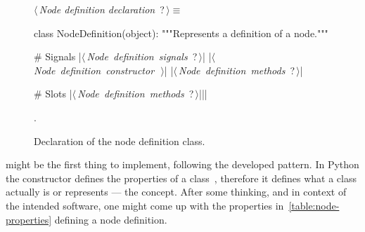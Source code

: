 \documentclass[%
    a4paper,    %
    justified,  %
    nobib,      %
    openany     %
]{tufte-book}
\begin{document}
\begin{figure}[h]
  \begin{flushleft} \small
\begin{minipage}{\linewidth}\label{scrap1}\raggedright\small
{} $\langle\,${\itshape Node definition declaration}\nobreak\ {\footnotesize {?}}$\,\rangle\equiv$
\vspace{-1ex}
\begin{pythoncode}
class NodeDefinition(object):
    """Represents a definition of a node."""

    # Signals
    |\hbox{$\langle\,${\itshape Node definition signals}\nobreak\ {\footnotesize ?}$\,\rangle$}|
    |\hbox{$\langle\,${\itshape Node definition constructor}\nobreak\ {\footnotesize {}}$\,\rangle$}|
    |\hbox{$\langle\,${\itshape Node definition methods}\nobreak\ {\footnotesize ?}$\,\rangle$}|

    # Slots
    |\hbox{$\langle\,${\itshape Node definition methods}\nobreak\ {\footnotesize ?}$\,\rangle$}||\NWsep|
\end{pythoncode}
\vspace{1.5ex}
\footnotesize
\begin{list}{}{\setlength{\itemsep}{-\parsep}\setlength{\itemindent}{-\leftmargin}}
\item {\NWtxtMacroNoRef}.

\item{}
\end{list}
\end{minipage}\vspace{4ex}
\end{flushleft}
\caption{Declaration of the node definition class.}
  \label{lst:node-def-class-decl}
\end{figure}

 might be the first thing to implement, following
the developed pattern. In Python the constructor defines the properties of a
class~, therefore it defines what a class
actually is or represents --- the concept. After some thinking, and in context
of the intended software, one might come up with the properties
in~\autoref{table:node-properties} defining a node definition.
\end{document}
